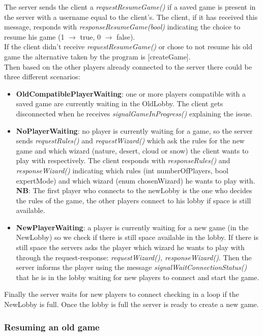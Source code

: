\documentclass[12pt]{article}
\begin{document}
				The server sends the client a \emph{requestResumeGame()} if a saved game is present in the server with a username equal to the client's. The client, if it has received this message, responds with \emph{responseResumeGame(bool)} indicating the choice to resume his game (1 \(\rightarrow\) true, 0 \(\rightarrow\) false). \\
				If the client didn't receive \emph{requestResumeGame()} or chose to not resume his old game the alternative taken by the program is [createGame]. \\
				Then based on the other players already connected to the server there could be three different scenarios:
				\begin{itemize}
					\item  \textbf{OldCompatiblePlayerWaiting}: one or more players compatible with a saved game are currently waiting in the OldLobby. The client gets disconnected when he receives \emph{signalGameInProgress()} explaining the issue.
					\item  \textbf{NoPlayerWaiting}: no player is currently waiting for a game, so the server sends \emph{requestRules()} and \emph{requestWizard()} which ask the rules for the new game and which wizard (nature, desert, cloud or snow) the client wants to play with respectively. The client responds with \emph{responseRules()} and \emph{responseWizard()} indicating which rules (int numberOfPlayers, bool expertMode) and which wizard (enum chosenWizard) he wants to play with. \\
					\textbf{NB}: The first player who connects to the newLobby is the one who decides the rules of the game, the other players connect to his lobby if space is still available.
					\item  \textbf{NewPlayerWaiting}: a player is currently waiting for a new game (in the NewLobby) so we check if there is still space available in the lobby. If there is still space the servers asks the player which wizard he wants to play with through the request-response: \emph{requestWizard(), responseWizard()}. Then the server informs the player using the message \emph{signalWaitConnectionStatus()} that he is in the lobby waiting for new players to connect and start the game.
				\end{itemize}
				Finally the server waits for new players to connect checking in a loop if the NewLobby is full. Once the lobby is full the server is ready to create a new game.
								
			\subsubsection{Resuming an old game}
			
\end{document}
